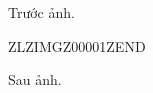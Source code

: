 \documentclass[12pt]{article}
\begin{document}
Trước ảnh.



ZLZIMGZ00001ZEND



Sau ảnh.
\end{document}
